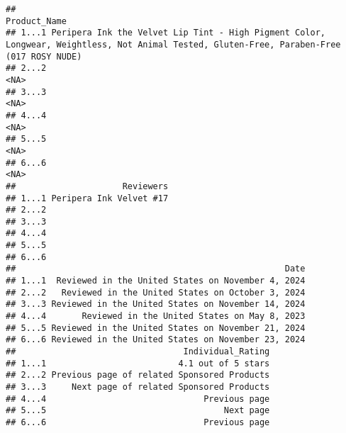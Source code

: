 \documentclass[
  11pt,
]{article}
\begin{document}
\begin{verbatim}
##                                                                                                                                    Product_Name
## 1...1 Peripera Ink the Velvet Lip Tint - High Pigment Color, Longwear, Weightless, Not Animal Tested, Gluten-Free, Paraben-Free (017 ROSY NUDE)
## 2...2                                                                                                                                      <NA>
## 3...3                                                                                                                                      <NA>
## 4...4                                                                                                                                      <NA>
## 5...5                                                                                                                                      <NA>
## 6...6                                                                                                                                      <NA>
##                     Reviewers
## 1...1 Peripera Ink Velvet #17
## 2...2                        
## 3...3                        
## 4...4                        
## 5...5                        
## 6...6                        
##                                                     Date
## 1...1  Reviewed in the United States on November 4, 2024
## 2...2   Reviewed in the United States on October 3, 2024
## 3...3 Reviewed in the United States on November 14, 2024
## 4...4       Reviewed in the United States on May 8, 2023
## 5...5 Reviewed in the United States on November 21, 2024
## 6...6 Reviewed in the United States on November 23, 2024
##                                 Individual_Rating
## 1...1                          4.1 out of 5 stars
## 2...2 Previous page of related Sponsored Products
## 3...3     Next page of related Sponsored Products
## 4...4                               Previous page
## 5...5                                   Next page
## 6...6                               Previous page

\end{verbatim}
\end{document}
